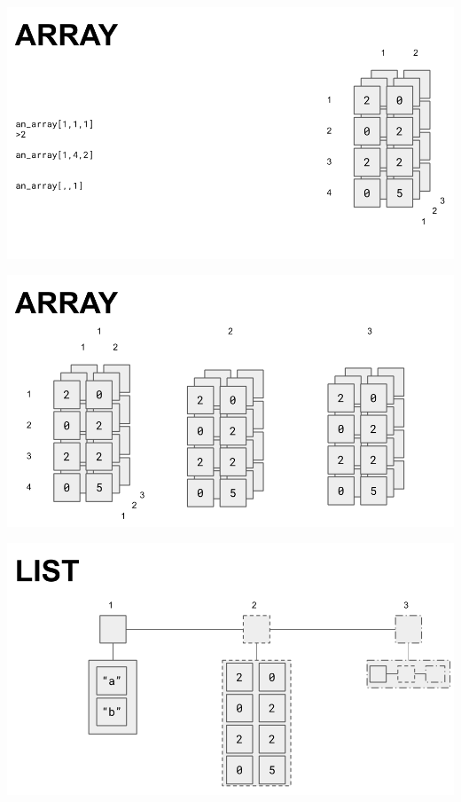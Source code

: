 \documentclass[
  ignorenonframetext,
]{beamer}
\begin{document}
\begin{frame}

\includegraphics{../external/images/ARRAY_3.png}

\end{frame}

\begin{frame}

\includegraphics{../external/images/ARRAY_4.png}

\end{frame}

\begin{frame}

\includegraphics{../external/images/LIST.png}

\end{frame}
\end{document}
